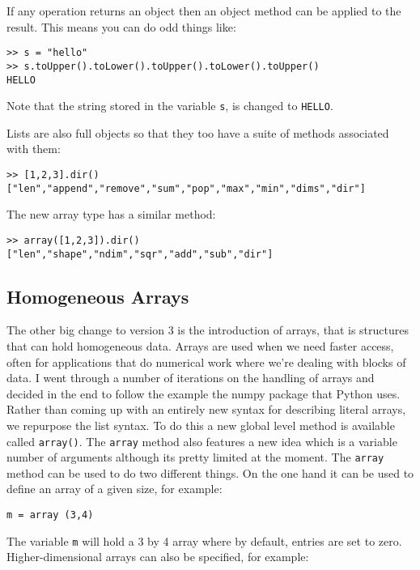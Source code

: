 If any operation returns an object then an object method can be applied to the result. This means you can do odd things like:

\begin{lstlisting}
>> s = "hello"
>> s.toUpper().toLower().toUpper().toLower().toUpper()
HELLO
\end{lstlisting}

Note that the string stored in the variable {\tt s}, is changed to {\tt HELLO}.

Lists are also full objects so that they too have a suite of methods associated with them:

\begin{lstlisting}
>> [1,2,3].dir()
["len","append","remove","sum","pop","max","min","dims","dir"]
\end{lstlisting}

The new array type has a similar method:

\begin{lstlisting}
>> array([1,2,3]).dir()
["len","shape","ndim","sqr","add","sub","dir"]
\end{lstlisting}


\subsection{Homogeneous Arrays}

The other big change to version 3 is the introduction of arrays, that is structures that can hold homogeneous data. Arrays are used when we need faster access, often for applications that do numerical work where we're dealing with blocks of data.  I went through a number of iterations on the handling of arrays and decided in the end to follow the example the numpy package that Python uses. Rather than coming up with an entirely new syntax for describing literal arrays, we repurpose the list syntax. To do this a new global level method is available called {\tt array()}. The {\tt array} method also features a new idea which is a variable number of arguments although its pretty limited at the moment. The {\tt array} method can be used to do two different things. On the one hand it can be used to define an array of a given size, for example:

\begin{lstlisting}
m = array (3,4)
\end{lstlisting}

The variable {\tt m} will hold a 3 by 4 array where by default, entries are set to zero. Higher-dimensional arrays can also be specified, for example:

